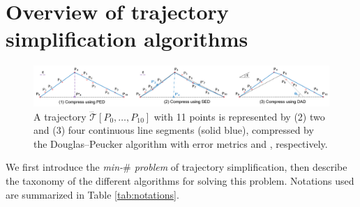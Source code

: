 \section{Overview of trajectory simplification algorithms}	%
\label{sec-problem}


\begin{figure}[tb!]
	\centering
	\includegraphics[scale=0.60]{Figures/Fig-DP.png}
	\vspace{-6ex}
	\caption{\small A trajectory $\dddot{\mathcal{T}}[P_0, \ldots, P_{10}]$  with 11 points is represented by (2) two and (3) four continuous line segments (solid blue), compressed by the Douglas--Peucker algorithm \cite{Douglas:Peucker} with error metrics \ped and \sed, respectively.}
	\vspace{-3ex}
	\label{fig:notations}
\end{figure}

We first introduce the \emph{min-$\#$ problem} of trajectory simplification, then describe the taxonomy of the different algorithms for solving this problem.
Notations used are summarized in Table \ref{tab:notations}.
	
